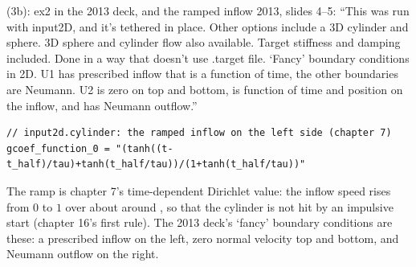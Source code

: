 \documentclass[aspectratio=169,11pt]{beamer}
\begin{document}
\begin{frame}[fragile]{ (3b): ex2 in the 2013 deck, and the ramped inflow}
\label{fr:ib2b}
\footnotesize 2013, slides 4--5: ``This was run with input2D, and it's tethered in place. Other options include a 3D cylinder and sphere. 3D sphere and cylinder flow also available. Target stiffness and damping included. Done in a way that doesn't use .target file. `Fancy' boundary conditions in 2D. U1 has prescribed inflow that is a function of time, the other boundaries are Neumann. U2 is zero on top and bottom, is function of time and position on the inflow, and has Neumann outflow.''
\vspace{1mm}

\begin{lstlisting}[style=inputtiny]
// input2d.cylinder: the ramped inflow on the left side (chapter 7)
gcoef_function_0 = "(tanh((t-t_half)/tau)+tanh(t_half/tau))/(1+tanh(t_half/tau))"
\end{lstlisting}
\footnotesize The ramp is chapter 7's time-dependent Dirichlet value: the inflow speed rises from $0$ to $1$ over about  around , so that the cylinder is not hit by an impulsive start (chapter 16's first rule). The 2013 deck's `fancy' boundary conditions are these: a prescribed inflow on the left, zero normal velocity top and bottom, and Neumann outflow on the right.
\end{frame}
\end{document}
